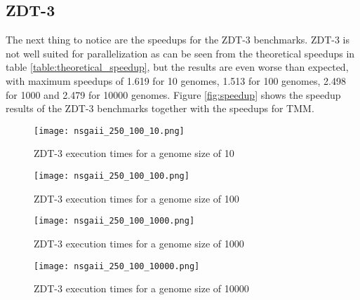 
\subsection{ZDT-3}
\label{chap:evaluation:result:zdt3}
The next thing to notice are the speedups for the ZDT-3 benchmarks. ZDT-3 is not well suited for parallelization as can be seen from the theoretical speedups in table \ref{table:theoretical_speedup}, but the results are even worse than expected, with maximum speedups of 1.619 for 10 genomes, 1.513 for 100 genomes, 2.498 for 1000 and 2.479 for 10000 genomes. Figure \ref{fig:speedup} shows the speedup results of the ZDT-3 benchmarks together with the speedups for TMM.

\begin{figure}
  \centering
  \texttt{[image: nsgaii\_250\_100\_10.png]}
  \caption[ZDT-3 execution times for a genome size of 10]{ZDT-3 execution times for a genome size of 10}
  \label{fig:nsga_250_100_10}
\end{figure}
\begin{figure}
  \centering
  \texttt{[image: nsgaii\_250\_100\_100.png]}
  \caption[ZDT-3 execution times for a genome size of 100]{ZDT-3 execution times for a genome size of 100}
  \label{fig:nsga_250_100_100}
\end{figure}
\begin{figure}
  \centering
  \texttt{[image: nsgaii\_250\_100\_1000.png]}
  \caption[ZDT-3 execution times for a genome size of 1000]{ZDT-3 execution times for a genome size of 1000}
  \label{fig:nsga_250_100_1000}
\end{figure}
\begin{figure}
  \centering
  \texttt{[image: nsgaii\_250\_100\_10000.png]}
  \caption[ZDT-3 execution times for a genome size of 10000]{ZDT-3 execution times for a genome size of 10000}
  \label{fig:nsga_250_100_10000}
\end{figure}

